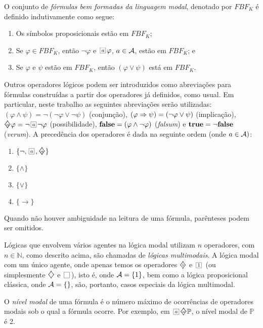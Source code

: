 \begin{definition} O conjunto de \textit{fórmulas bem formadas da linguagem modal}, denotado por
$FBF_{K}$ é definido indutivamente como segue:
    \label{def:fbf}

    \begin{enumerate}
    \item Os símbolos proposicionais estão em $FBF_{K}$;
    \item Se $\varphi \in FBF_{K}$, então $\neg \varphi$ e $\nec{\agent}\varphi$, $a \in {\cal{A}}$, estão em $FBF_{K}$; e
    \item Se $\varphi$ e $\psi$ estão em $FBF_{K}$, então $(\varphi \vee \psi)$ está em $FBF_{K}$.
    \end{enumerate}
    
\label{def:fbf}
\end{definition}

Outros operadores lógicos podem ser introduzidos como abreviações para fórmulas
construídas a partir dos operadores já definidos, como usual. Em particular,
neste trabalho as seguintes abreviações serão utilizadas: $(\varphi \land \psi)
= \neg (\neg \varphi \lor \neg \psi)$ (conjunção), $(\varphi \Rightarrow \psi) = (\neg
\varphi \lor \psi)$ (implicação), $\pos{\agent} \varphi= \neg \nec{\agent} \neg
\varphi$ (possibilidade), $\mbox{\rm\bf false} = (\varphi \land \neg \varphi)$
(\emph{falsum}) e $\mbox{\rm\bf true} = \neg \mbox{\rm\bf false}$ (\emph{verum}). A precedência dos
operadores é dada na seguinte ordem (onde $a \in {\cal{A}})$:
\begin{enumerate} 
    \item $\{\neg, \nec{\agent}, \pos{\agent}\}$ 
    \item $\{\wedge\}$ 
    \item $\{\vee\}$ 
    \item $\{\rightarrow\}$ 
\end{enumerate}

Quando não houver ambiguidade na leitura de uma fórmula, parênteses podem ser
omitidos.

Lógicas que envolvem vários agentes na lógica modal utilizam $n$ operadores, com
$n \in \mathbb{N}$, como descrito acima, são chamadas de \emph{lógicas
multimodais}. A lógica modal com um único agente, onde apenas temos os
operadores $\pos{1}$ e $\nec{1}$ (ou simplesmente $\pos{}$ e $\nec{}$), isto é,
onde ${\cal{A}} =\{1\}$, bem como a lógica proposicional clássica, onde ${\cal{A}} =
\{\}$, são, portanto, casos especiais da lógica multimodal.

O \emph{nível modal} de uma fórmula é o número máximo de ocorrências de
operadores modais sob o qual a fórmula ocorre. Por exemplo, em
$\nec{\agent}\pos{\agent}\mathbb{P}$, o nível modal de $\mathbb{P}$ é 2.

